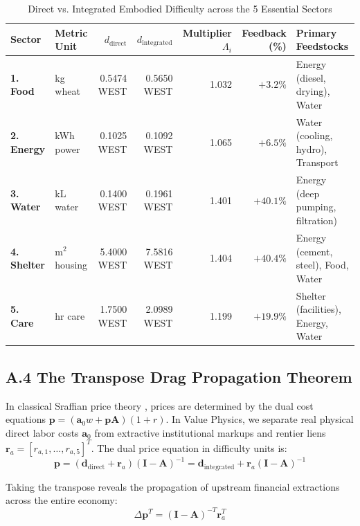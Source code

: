 \documentclass[preprint,12pt,authoryear]{elsarticle}
\theoremstyle{definition}
\begin{document}
\begin{table}[htbp]
\centering
\small
\caption{Direct vs. Integrated Embodied Difficulty across the 5 Essential Sectors}
\label{tab:leontief_difficulty}
\begin{tabularx}{\textwidth}{l l r r r r p{3.2cm}}
\toprule
\textbf{Sector} & \textbf{Metric Unit} & \textbf{$d_{\text{direct}}$} & \textbf{$d_{\text{integrated}}$} & \textbf{Multiplier $\Lambda_i$} & \textbf{Feedback (\%)} & \textbf{Primary Feedstocks} \\
\midrule
\textbf{1. Food} & kg wheat & 0.5474 WEST & 0.5650 WEST & 1.032 & $+3.2\%$ & Energy (diesel, drying), Water \\
\textbf{2. Energy} & kWh power & 0.1025 WEST & 0.1092 WEST & 1.065 & $+6.5\%$ & Water (cooling, hydro), Transport \\
\textbf{3. Water} & kL water & 0.1400 WEST & 0.1961 WEST & 1.401 & $+40.1\%$ & Energy (deep pumping, filtration) \\
\textbf{4. Shelter} & $\text{m}^2$ housing & 5.4000 WEST & 7.5816 WEST & 1.404 & $+40.4\%$ & Energy (cement, steel), Food, Water \\
\textbf{5. Care} & hr care & 1.7500 WEST & 2.0989 WEST & 1.199 & $+19.9\%$ & Shelter (facilities), Energy, Water \\
\bottomrule
\end{tabularx}
\end{table}

\subsection*{A.4 The Transpose Drag Propagation Theorem}

In classical Sraffian price theory \citep{sraffa1960}, prices are determined by the dual cost equations $\mathbf{p} = (\mathbf{a}_0 w + \mathbf{p} \mathbf{A})(1 + r)$. In Value Physics, we separate real physical direct labor costs $\mathbf{a}_0$ from extractive institutional markups and rentier liens $\mathbf{r}_a = [r_{a,1}, \dots, r_{a,5}]^T$. The dual price equation in difficulty units is:
\begin{equation}
\mathbf{p} = (\mathbf{d}_{\text{direct}} + \mathbf{r}_a)(\mathbf{I} - \mathbf{A})^{-1} = \mathbf{d}_{\text{integrated}} + \mathbf{r}_a (\mathbf{I} - \mathbf{A})^{-1} \label{eq:dual_price_equation}
\end{equation}

Taking the transpose reveals the propagation of upstream financial extractions across the entire economy:
\begin{equation}
\Delta \mathbf{p}^T = (\mathbf{I} - \mathbf{A})^{-T} \mathbf{r}_a^T \label{eq:transpose_drag}
\end{equation}
\end{document}
